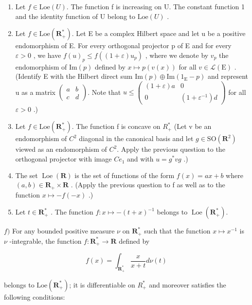 \begin{enumerate}
\def\labelenumi{\alph{enumi})}
\item
  Let \(f \in \text{Loe}(U)\). The function f is increasing on U. The constant function 1 and the identity function of U belong to \(\text{Loe}(U)\) .
\item
  Let \(f \in \text{Loe}(\mathbf{R}_+^*)\). Let E be a complex Hilbert space and let u be a positive endomorphism of E. For every orthogonal projector p of E and for every \(\varepsilon > 0\) , we have \(f(u)_p \leqslant f((1 + \varepsilon)u_p)\) , where we denote by \(v_p\) the endomorphism of \(\text{Im}(p)\) defined by \(x \mapsto p(v(x))\) for all \(v \in \mathcal{L}(\text{E})\) . (Identify E with the Hilbert direct sum \(\text{Im}(p) \oplus \text{Im}(1_{\text{E}} - p)\) and represent u as a matrix \(\begin{pmatrix} a & b \\ c & d \end{pmatrix}\). Note that \(u \leqslant \begin{pmatrix} (1 + \varepsilon)a & 0 \\ 0 & (1 + \varepsilon^{-1})d \end{pmatrix}\) for all \(\varepsilon > 0\) .)
\item
  Let \(f \in \text{Loe}(\mathbf{R}_{+}^{*})\). The function f is concave on \(R_{+}^{*}\) (Let v be an endomorphism of \(C^{2}\) diagonal in the canonical basis and let \(g \in \text{SO}(\mathbf{R}^{2})\) viewed as an endomorphism of \(C^{2}\). Apply the previous question to the orthogonal projector with image \(Ce_{1}\) and with \(u = g^{*}vg\) .)
\item
  The set \(\operatorname{Loe}(\mathbf{R})\) is the set of functions of the form \(f(x)=ax+b\) where \((a,b)\in\mathbf{R}_{+}\times\mathbf{R}\) . (Apply the previous question to f as well as to the function \(x\mapsto-f(-x)\) .)
\item
  Let \(t \in \mathbf{R}_{+}^{*}\) . The function \(f: x \mapsto -(t + x)^{-1}\) belongs to \(\operatorname{Loe}(\mathbf{R}_{+}^{*})\).
\end{enumerate}

\(f)\) For any bounded positive measure \(\nu\) on \(\mathbf{R}_{+}^{*}\) such that the function \(x\mapsto x^{-1}\) is \(\nu\) -integrable, the function \(f\colon\mathbf{R}_{+}^{*}\to\mathbf{R}\) defined by

\[
f (x) = \int_ {\mathbf {R} _ {+} ^ {*}} \frac {x}{x + t} d \nu (t)
\]

belongs to \(\text{Loe}(\mathbf{R}_{+}^{*})\); it is differentiable on \(R_{+}^{*}\) and moreover satisfies the following conditions:

